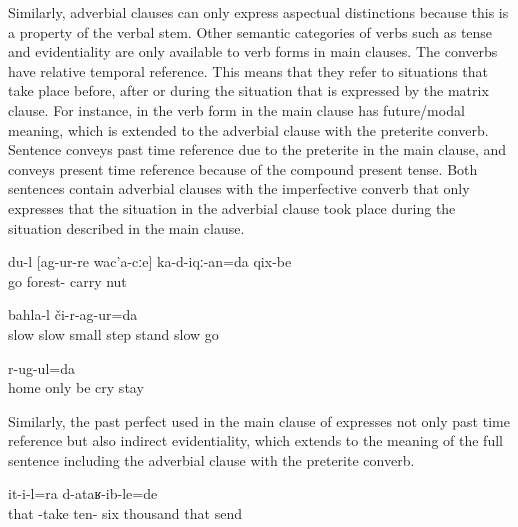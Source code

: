 Similarly, adverbial clauses can only express aspectual distinctions because this is a property of the verbal stem. Other semantic categories of verbs such as tense and evidentiality are only available to verb forms in main clauses. The converbs have relative temporal reference. This means that they refer to situations that take place before, after or during the situation that is expressed by the matrix clause. For instance, in  the verb form in the main clause has future/modal meaning, which is extended to the adverbial clause with the preterite converb. Sentence  conveys past time reference due to the preterite in the main clause, and  conveys present time reference because of the compound present tense. Both sentences contain adverbial clauses with the imperfective converb that only expresses that the situation in the adverbial clause took place during the situation described in the main clause.
%
\begin{exe}
	\ex	\label{ex:I will go to the forest and bring nuts@37}
	\gll	du-l	[ag-ur-re	wac'a-cːe]	ka-d-iqː-an=da	qix-be\\
			go	forest-	carry	nut\\
	\glt	{} 

	\ex	\label{ex:‎Very slowly making small steps we went across (the river)}
		bahla-l	či-r-ag-ur=da\\
		slow	slow	small	step	stand	slow	go\\
	\glt	{} 

	\ex	\label{ex:Being alone at home, I stay not crying}
	\gll	[qili-r	du=gina	r-irχ-ul]	[a-r-isː-ul]	r-ug-ul=da\\
		home	only	be	cry	stay\\
	\glt	{} 
\end{exe}

Similarly, the past perfect used in the main clause of  expresses not only past time reference but also indirect evidentiality, which extends to the meaning of the full sentence including the adverbial clause with the preterite converb.
%
\begin{exe}
	\ex	\label{ex:From her (he) took 16 000, and he sent (that money to us)}
		it-i-l=ra d-ataʁ-ib-le=de\\
		that	-take	ten-	six	thousand that	send\\
	\glt	{}
\end{exe}

